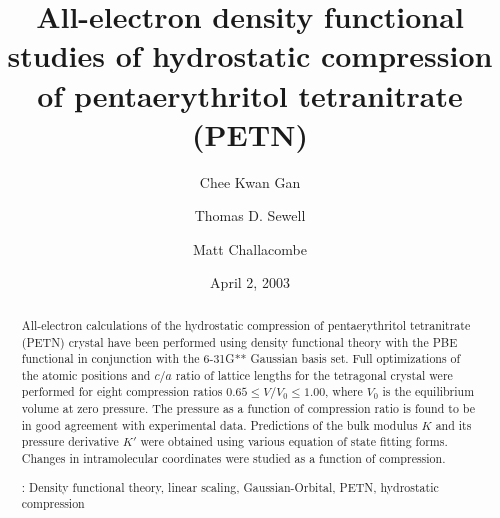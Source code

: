 \documentclass[prb,aps,nobibnotes,twocolumn,doublespace,twocolumngrid,superbib]{revtex4}
\begin{document}
\title[Short Title]{ 
All-electron density functional studies of hydrostatic compression of 
pentaerythritol tetranitrate (PETN) }
\author{Chee Kwan Gan\footnotemark[1]}
\author{Thomas D. Sewell\footnotemark[2]}
\author{Matt Challacombe\footnotemark[3]}

\date{April 2, 2003}

\begin{abstract}
All-electron calculations of the hydrostatic compression of
pentaerythritol tetranitrate (PETN) crystal have been performed using
density functional theory with the PBE functional in
conjunction with the 6-31G** Gaussian basis set.  Full optimizations
of the atomic positions and $c/a$ ratio of lattice lengths for the 
tetragonal crystal were performed for eight compression ratios $0.65 
\le V/V_0 \le 1.00$, where $V_0$ is the equilibrium volume at zero
pressure.  The pressure as a function of compression ratio
is found to be in good agreement with experimental data.  Predictions
of the bulk modulus $K$ and its pressure derivative $K'$ were obtained
using various equation of state fitting forms. Changes in intramolecular 
coordinates were studied as a function of compression.



\smallskip
{}: Density functional theory, linear scaling, 
Gaussian-Orbital, PETN, hydrostatic compression
\end{abstract}


\maketitle

\end{document}
